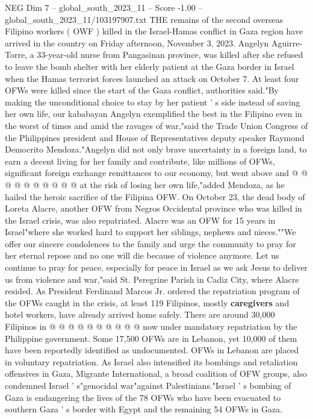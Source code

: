 \begin{textsample}{NEG Dim 7 – global\_south\_2023\_11 – Score -1.00 – global\_south\_2023\_11/103197907.txt}  \label{ex:f7_neg_150}
THE remains of the second overseas Filipino workers ( OWF ) killed in the Israel-Hamas conflict in Gaza region have arrived in the country on Friday afternoon, November 3, 2023.
Angelyn Aguirre-Torre, a 33-year-old nurse from Pangasinan province, was killed after she refused to leave the bomb shelter with her elderly patient at the Gaza border in Israel when the Hamas terrorist forces launched an attack on October 7.
At least four OFWs were killed since the start of the Gaza conflict, authorities said."By making the unconditional choice to stay by her patient ' s side instead of saving her own life, our kababayan Angelyn exemplified the best in the Filipino even in the worst of times and amid the ravages of war,"said the Trade Union Congress of the Philippines president and House of Representatives deputy speaker Raymond Democrito Mendoza."Angelyn did not only brave uncertainty in a foreign land, to earn a decent living for her family and contribute, like millions of OFWs, significant foreign exchange remittances to our economy, but went above and @ @ @ @ @ @ @ @ @ @ at the risk of losing her own life,"added Mendoza, as he hailed the heroic sacrifice of the Filipina OFW.
On October 23, the dead body of Loreta Alacre, another OFW from Negros Occidental province who was killed in the Israel crisis, was also repatriated.
Alacre was an OFW for 15 years in Israel"where she worked hard to support her siblings, nephews and nieces.""We offer our sincere condolences to the family and urge the community to pray for her eternal repose and no one will die because of violence anymore.
Let us continue to pray for peace, especially for peace in Israel as we ask Jesus to deliver us from violence and war,"said St.
Peregrine Parish in Cadiz City, where Alacre resided.
As President Ferdinand Marcos Jr. ordered the repatriation program of the OFWs caught in the crisis, at least 119 Filipinos, mostly \textbf{caregivers} and hotel workers, have already arrived home safely.
There are around 30,000 Filipinos in @ @ @ @ @ @ @ @ @ @ now under mandatory repatriation by the Philippine government.
Some 17,500 OFWs are in Lebanon, yet 10,000 of them have been reportedly identified as undocumented.
OFWs in Lebanon are placed in voluntary repatriation.
As Israel also intensified its bombings and retaliation offensives in Gaza, Migrante International, a broad coalition of OFW groups, also condemned Israel ' s"genocidal war"against Palestinians."Israel ' s bombing of Gaza is endangering the lives of the 78 OFWs who have been evacuated to southern Gaza ' s border with Egypt and the remaining 54 OFWs in Gaza.

\end{textsample}
